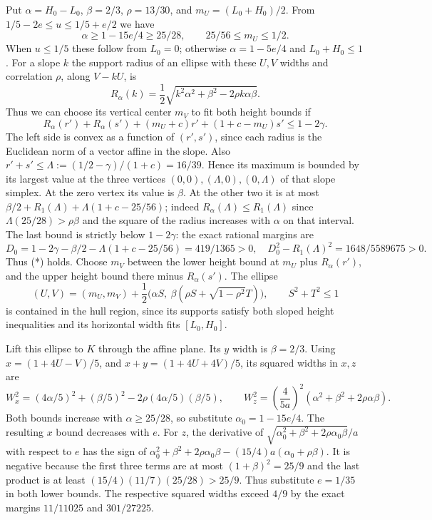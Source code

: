 \documentclass[
  10pt,
]{article}
\begin{document}
Put \(\alpha=H_0-L_0\), \(\beta=2/3\), \(\rho=13/30\), and
\(m_U=(L_0+H_0)/2\). From \(1/5-2e\le u\le1/5+e/2\) we have \[
 \alpha\ge1-15e/4\ge25/28,\qquad 25/56\le m_U\le1/2.
\] When \(u\le1/5\) these follow from \(L_0=0\); otherwise
\(\alpha=1-5e/4\) and \(L_0+H_0\le1\). For a slope \(k\) the support
radius of an ellipse with these \(U,V\) widths and correlation \(\rho\),
along \(V-kU\), is \[
 R_\alpha(k)=\frac12\sqrt{k^2\alpha^2+\beta^2-2\rho k\alpha\beta}.
\] Thus we can choose its vertical center \(m_V\) to fit both height
bounds if \[
 R_\alpha(r')+R_\alpha(s')+(m_U+c)r'+(1+c-m_U)s'\le1-2\gamma.
 \tag{*}
\] The left side is convex as a function of \((r',s')\), since each
radius is the Euclidean norm of a vector affine in the slope. Also
\(r'+s'\le\Lambda:=(1/2-\gamma)/(1+c)=16/39\). Hence its maximum is
bounded by its largest value at the three vertices
\((0,0),(\Lambda,0),(0,\Lambda)\) of that slope simplex. At the zero
vertex its value is \(\beta\). At the other two it is at most
\(\beta/2+R_1(\Lambda)+\Lambda(1+c-25/56)\); indeed
\(R_\alpha(\Lambda)\le R_1(\Lambda)\) since \(\Lambda(25/28)>\rho\beta\)
and the square of the radius increases with \(\alpha\) on that interval.
The last bound is strictly below \(1-2\gamma\): the exact rational
margins are \[
 D_0=1-2\gamma-\beta/2-\Lambda(1+c-25/56)=419/1365>0,
 \quad D_0^2-R_1(\Lambda)^2=1648/5589675>0.
\] Thus (*) holds. Choose \(m_V\) between the lower height bound at
\(m_U\) plus \(R_\alpha(r')\), and the upper height bound there minus
\(R_\alpha(s')\). The ellipse \[
 (U,V)=(m_U,m_V)+\frac12\bigl(\alpha S,\ \beta(\rho S+\sqrt{1-\rho^2}T)\bigr),
 \qquad S^2+T^2\le1
\] is contained in the hull region, since its supports satisfy both
sloped height inequalities and its horizontal width fits \([L_0,H_0]\).

Lift this ellipse to \(K\) through the affine plane. Its \(y\) width is
\(\beta=2/3\). Using \(x=(1+4U-V)/5\), and \(x+y=(1+4U+4V)/5\), its
squared widths in \(x,z\) are \[
 W_x^2=(4\alpha/5)^2+(\beta/5)^2-2\rho(4\alpha/5)(\beta/5),\qquad
 W_z^2=\left(\frac{4}{5a}\right)^2(\alpha^2+\beta^2+2\rho\alpha\beta).
\] Both bounds increase with \(\alpha\ge25/28\), so substitute
\(\alpha_0=1-15e/4\). The resulting \(x\) bound decreases with \(e\).
For \(z\), the derivative of
\(\sqrt{\alpha_0^2+\beta^2+2\rho\alpha_0\beta}/a\) with respect to \(e\)
has the sign of
\(\alpha_0^2+\beta^2+2\rho\alpha_0\beta-(15/4)a(\alpha_0+\rho\beta)\).
It is negative because the first three terms are at most
\((1+\beta)^2=25/9\) and the last product is at least
\((15/4)(11/7)(25/28)>25/9\). Thus substitute \(e=1/35\) in both lower
bounds. The respective squared widths exceed \(4/9\) by the exact
margins \(11/11025\) and \(301/27225\).
\end{document}
